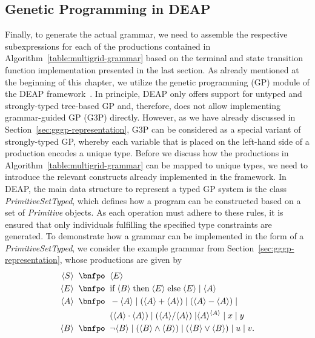 \subsection{Genetic Programming in DEAP}
\label{sec:evostencils-part1:productions}
Finally, to generate the actual grammar, we need to assemble the respective subexpressions for each of the productions contained in Algorithm~\ref{table:multigrid-grammar} based on the terminal and state transition function implementation presented in the last section.
As already mentioned at the beginning of this chapter, we utilize the genetic programming (GP) module of the DEAP framework~\cite{rainville2012deap}. 
In principle, DEAP only offers support for untyped and strongly-typed tree-based GP and, therefore, does not allow implementing grammar-guided GP (G3P) directly.
However, as we have already discussed in Section~\ref{sec:gggp-representation}, G3P can be considered as a special variant of strongly-typed GP, whereby each variable that is placed on the left-hand side of a production encodes a unique type.
Before we discuss how the productions in Algorithm~\ref{table:multigrid-grammar} can be mapped to unique types, we need to introduce the relevant constructs already implemented in the framework.
In DEAP, the main data structure to represent a typed GP system is the class \emph{PrimitiveSetTyped}, which defines how a program can be constructed based on a set of \emph{Primitive} objects.
As each operation must adhere to these rules, it is ensured that only individuals fulfilling the specified type constraints are generated.
To demonstrate how a grammar can be implemented in the form of a \emph{PrimitiveSetTyped}, we consider the example grammar from Section~\ref{sec:gggp-representation}, whose productions are given by
\begin{equation*}
	\begin{split}
		\ps S \; \; \bnfpo & \; \; \ps E \\
		\ps E \; \; \bnfpo & \; \; \text{if} \; \ps B \; \text{then} \; \ps E \; \text{else} \; \ps E \; | \; \ps A \\
		\ps A \; \; \bnfpo & \; \; -\ps A \; | \; (\ps A + \ps A) \; | \; (\ps A - \ps A) \; | \\
		& \; \; (\ps A \cdot \ps A) \; | \; (\ps A / \ps A) \; | \ps{A}^{\ps{A}} \; | \; x \; | \; y \\  
		\ps B \; \; \bnfpo & \; \;  \neg \ps B \; | \; (\ps B \wedge \ps B) \; | \; (\ps B \vee \ps B) \; | \; u \; | \; v.
	\end{split}
\end{equation*}
